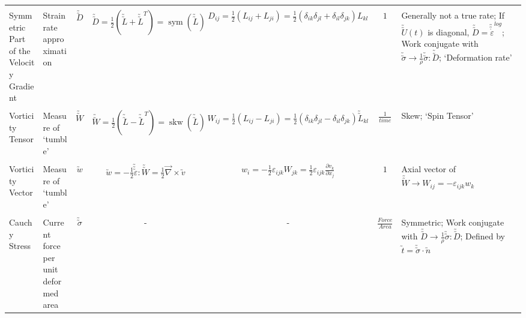 \documentclass[10pt]{article}
\newcommand{\tu}[1]{\utilde{#1}}
\newcommand{\tuu}[1]{\utilde{\utilde{#1}}}
\newcommand{\tuuu}[1]{\utilde{\utilde{\utilde{#1}}}}
\DeclareMathOperator{\myskew}{skw}
\newcommand{\skw}[1]{\myskew(#1)}
\DeclareMathOperator{\mysym}{sym}
\newcommand{\sym}[1]{\mysym(#1)}
\begin{document}
\begin{center}
\begin{tabular}{l m{3in} c c c c m{5in}}
\hline
\\[-1ex]
Symmetric Part of the Velocity Gradient
&%
Strain rate approximation
&%
$ \utilde{\utilde{D}} $
&%
$ \utilde{\utilde{D}} = \frac{1}{2}(\utilde{\utilde{L}}+\utilde{\utilde{L}}^{T}) = \sym{\utilde{\utilde{L}}} $
&%
$ D_{ij} = \frac{1}{2}(L_{ij} + L_{ji}) = \frac{1}{2}(\delta_{ik}\delta_{jl} + \delta_{il}\delta_{jk}) L_{kl}$
&%
$ 1 $
&%
Generally not a true rate; If $\tuu{U}(t)$ is diagonal, $\tuu{D} = \tuu{\dot{\varepsilon}}^{log}$; Work conjugate with $\tuu{\sigma} \rightarrow \frac{1}{\rho}\tuu{\sigma}\colon\tuu{D}$; `Deformation rate'
\\[1ex]

\hline
\\[-1ex]
Vorticity Tensor
&%
Measure of `tumble'
&%
$ \tuu{W} $
&%
$ \tuu{W} = \frac{1}{2}(\tuu{L} - \tuu{L}^{T}) = \skw{\tuu{L}} $
&%
$ W_{ij} = \frac{1}{2}(L_{ij} - L_{ji}) = \frac{1}{2}(\delta_{ik}\delta_{jl} - \delta_{il}\delta_{jk})\tuu{L}_{kl}$
&%
$ \frac{1}{time} $
&%
Skew; `Spin Tensor'
\\[1ex]


\hline
\\[-1ex]
Vorticity Vector
&%
Measure of `tumble'
&%
$ \tu{w} $
&%
$ \tu{w} = -\frac{1}{2}\tuuu{\varepsilon}\colon\tuu{W} = \frac{1}{2}\overrightarrow{\nabla} \times \tu{v}$
&%
$ w_{i} = -\frac{1}{2} \varepsilon_{ijk} W_{jk} = \frac{1}{2} \varepsilon_{ijk} \frac{\partial v_{k}}{\partial x_{j}}$
&%
$ 1 $
&%
Axial vector of $\tuu{W} \rightarrow W_{ij} = -\varepsilon_{ijk} w_{k}$
\\[1ex]


\hline
\\[-1ex]
Cauchy Stress
&%
Current force per unit deformed area
&%
$ \tuu{\sigma} $
&%
-
&%
-
&%
$ \frac{Force}{Area} $
&%
Symmetric; Work conjugate with $\tuu{D} \rightarrow \frac{1}{\rho}\tuu{\sigma}\colon\tuu{D}$; Defined by $\tu{t} = \tuu{\sigma}\cdot\tu{n}$
\\[1ex]



\end{tabular}
\end{center}
\end{document}
